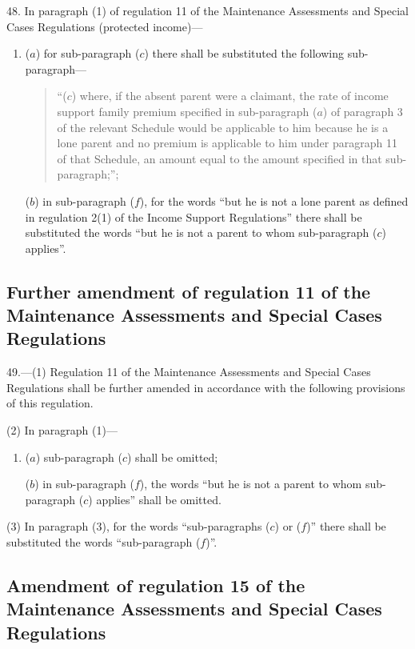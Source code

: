 \documentclass[12pt,a4paper]{article}
\begin{document}
48.  In paragraph (1) of regulation 11 of the Maintenance Assessments and Special Cases Regulations (protected income)—
\begin{enumerate}\item[]
($a$) for sub-paragraph ($c$) there shall be substituted the following sub-paragraph—
\begin{quotation}
“($c$) where, if the absent parent were a claimant, the rate of income support family premium specified in sub-paragraph ($a$) of paragraph 3 of the relevant Schedule would be applicable to him because he is a lone parent and no premium is applicable to him under paragraph 11 of that Schedule, an amount equal to the amount specified in that sub-paragraph;”;
\end{quotation}

($b$) in sub-paragraph ($f$), for the words “but he is not a lone parent as defined in regulation 2(1) of the Income Support Regulations” there shall be substituted the words “but he is not a parent to whom sub-paragraph ($c$) applies”.
\end{enumerate}

\subsection[49. Further amendment of regulation 11 of the Maintenance Assessments and Special Cases Regulations]{Further amendment of regulation 11 of the Maintenance Assessments and Special Cases Regulations}

49.—(1) Regulation 11 of the Maintenance Assessments and Special Cases Regulations shall be further amended in accordance with the following provisions of this regulation.

(2) In paragraph (1)—
\begin{enumerate}\item[]
($a$) sub-paragraph ($c$) shall be omitted;

($b$) in sub-paragraph ($f$), the words “but he is not a parent to whom sub-paragraph ($c$) applies” shall be omitted.
\end{enumerate}

(3) In paragraph (3), for the words “sub-paragraphs ($c$) or ($f$)” there shall be substituted the words “sub-paragraph ($f$)”.

\subsection[50. Amendment of regulation 15 of the Maintenance Assessments and Special Cases Regulations]{Amendment of regulation 15 of the Maintenance Assessments and Special Cases Regulations}
\end{document}
